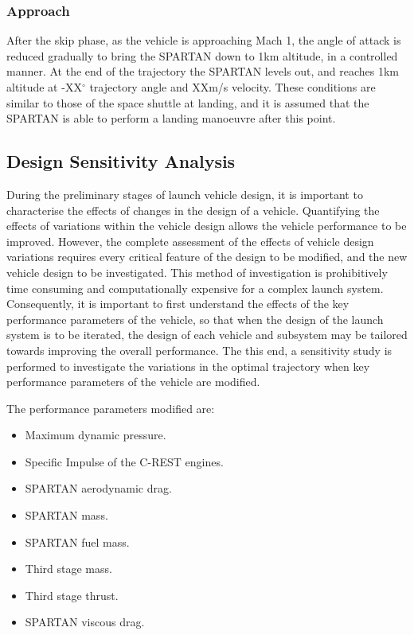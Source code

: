 \subsubsection{ Approach}
After the skip phase, as the vehicle is approaching Mach 1, the angle of attack is reduced gradually to bring the SPARTAN down to 1km altitude, in a controlled manner. 
At the end of the trajectory the SPARTAN levels out, and reaches 1km altitude at -XX$^\circ$ trajectory angle and XXm/s velocity. These conditions are similar to those of the space shuttle at landing\cite{Ryba2017}, and it is assumed that the SPARTAN is able to perform a landing manoeuvre after this point. 








\subsection{Design Sensitivity Analysis}

During the preliminary stages of launch vehicle design, it is important to characterise the effects of changes in the design of a vehicle.  
Quantifying the effects of variations within the vehicle design allows the vehicle performance to be improved. 
However, the complete assessment of the effects of vehicle design variations requires every critical feature of the design to be modified, and the new vehicle design to be investigated. This method of investigation is prohibitively time consuming and computationally expensive for a complex launch system. Consequently, it is important to first understand the effects of the key performance parameters of the vehicle, so that when the design of the launch system is to be iterated, the design of each vehicle and subsystem may be tailored towards improving the overall performance.
 The this end, a sensitivity study is performed to investigate the variations in the optimal trajectory when key performance parameters of the vehicle are modified.

The performance parameters modified are:

\begin{itemize}
	\item Maximum dynamic pressure.
	\item Specific Impulse of the C-REST engines. 
	\item SPARTAN aerodynamic drag.
	\item SPARTAN mass.
	\item SPARTAN fuel mass.
	\item Third stage mass.
	\item Third stage thrust. 
	\item SPARTAN viscous drag. 
	
\end{itemize}



